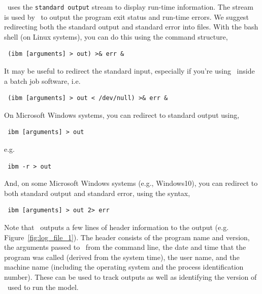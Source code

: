 \IBM\ uses the \texttt{standard output} stream to display run-time information. The  stream is used by \IBM\ to output the program exit status and run-time errors. We suggest redirecting both the standard output and standard error into files. With the bash shell (on Linux systems), you can do this using the command structure,

\begin{verbatim} (ibm [arguments] > out) >& err &\end{verbatim}

It may be useful to redirect the standard input, especially if you're using \IBM\ inside a batch job software, i.e. 

\begin{verbatim} (ibm [arguments] > out < /dev/null) >& err &\end{verbatim}

On Microsoft Windows systems, you can redirect to standard output using,

\begin{verbatim} ibm [arguments] > out\end{verbatim}

e.g.

\begin{verbatim} ibm -r > out\end{verbatim}

And, on some Microsoft Windows systems (e.g., Windows10), you can redirect to both standard output and standard error, using the syntax, 

\begin{verbatim} ibm [arguments] > out 2> err\end{verbatim}

Note that \IBM\ outputs a few lines of header information to the output (e.g. Figure~\ref{fig:log_file_1}). The header consists of the program name and version, the arguments passed to \IBM\ from the command line, the date and time that the program was called (derived from the system time), the user name, and the machine name (including the operating system and the process identification number). These can be used to track outputs as well as identifying the version of \IBM\ used to run the model.


\subsection{\label{sec:command-line-arguments}}

